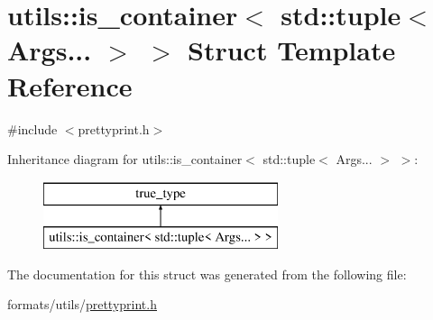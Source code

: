 \hypertarget{structutils_1_1is__container_3_01std_1_1tuple_3_01_args_8_8_8_01_4_01_4}{}\section{utils\+::is\+\_\+container$<$ std\+::tuple$<$ Args... $>$ $>$ Struct Template Reference}
\label{structutils_1_1is__container_3_01std_1_1tuple_3_01_args_8_8_8_01_4_01_4}


{\ttfamily \#include $<$prettyprint.\+h$>$}

Inheritance diagram for utils\+::is\+\_\+container$<$ std\+::tuple$<$ Args... $>$ $>$\+:\begin{figure}[H]
\begin{center}
\leavevmode
\includegraphics[height=2.000000cm]{d5/d11/structutils_1_1is__container_3_01std_1_1tuple_3_01_args_8_8_8_01_4_01_4}
\end{center}
\end{figure}


The documentation for this struct was generated from the following file\+:\begin{DoxyCompactItemize}
\item 
formats/utils/\mbox{\hyperlink{prettyprint_8h}{prettyprint.\+h}}\end{DoxyCompactItemize}
